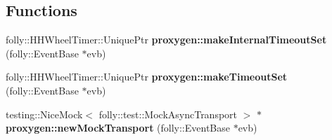 \subsection*{Functions}
\begin{DoxyCompactItemize}
\item 
folly\+::\+H\+H\+Wheel\+Timer\+::\+Unique\+Ptr {\bf proxygen\+::make\+Internal\+Timeout\+Set} (folly\+::\+Event\+Base $\ast$evb)
\item 
folly\+::\+H\+H\+Wheel\+Timer\+::\+Unique\+Ptr {\bf proxygen\+::make\+Timeout\+Set} (folly\+::\+Event\+Base $\ast$evb)
\item 
testing\+::\+Nice\+Mock$<$ folly\+::test\+::\+Mock\+Async\+Transport $>$ $\ast$ {\bf proxygen\+::new\+Mock\+Transport} (folly\+::\+Event\+Base $\ast$evb)
\end{DoxyCompactItemize}
